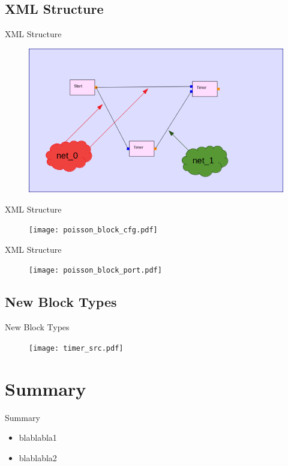 \documentclass{beamer}
\begin{document}
\subsection*{XML Structure}
\begin{frame}{XML Structure}
    \begin{figure}
        \includegraphics[width=\linewidth]{poisson_nets.png}
        \label{fig:poisson_nets}
    \end{figure}
\end{frame}
\begin{frame}{XML Structure}
    \begin{figure}
        \texttt{[image: poisson\_block\_cfg.pdf]}
        \label{fig:poisson_block_cfg}
    \end{figure}
\end{frame}
\begin{frame}{XML Structure}
    \begin{figure}
        \texttt{[image: poisson\_block\_port.pdf]}
        \label{fig:poisson_block_port}
    \end{figure}
\end{frame}


\subsection*{New Block Types}
\begin{frame}{New Block Types}
    \begin{figure}
        \texttt{[image: timer\_src.pdf]}
        \label{fig:timer_src}
    \end{figure}
\end{frame}

\section{Summary}
\begin{frame}{Summary}
	\begin{itemize}
		\item blablabla1
		\item blablabla2
	\end{itemize}
\end{frame}
\end{document}
